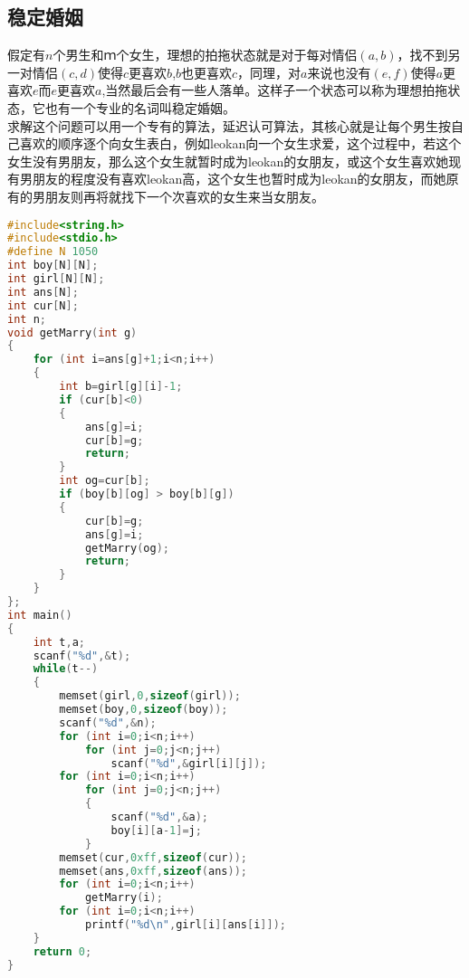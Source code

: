 \subsection{稳定婚姻}
	假定有$n$个男生和$ｍ$个女生，理想的拍拖状态就是对于每对情侣$(a,b)$，找不到另一对情侣$(c,d)$使得$c$更喜欢$b$,$b$也更喜欢$c$，同理，对$a$来说也没有$(e,f)$使得$a$更喜欢$e$而$e$更喜欢$a$,当然最后会有一些人落单。这样子一个状态可以称为理想拍拖状态，它也有一个专业的名词叫稳定婚姻。\\
	求解这个问题可以用一个专有的算法，延迟认可算法，其核心就是让每个男生按自己喜欢的顺序逐个向女生表白，例如leokan向一个女生求爱，这个过程中，若这个女生没有男朋友，那么这个女生就暂时成为leokan的女朋友，或这个女生喜欢她现有男朋友的程度没有喜欢leokan高，这个女生也暂时成为leokan的女朋友，而她原有的男朋友则再将就找下一个次喜欢的女生来当女朋友。
	\begin{lstlisting}[language=c++]
#include<string.h>
#include<stdio.h>
#define N 1050
int boy[N][N];
int girl[N][N];
int ans[N];
int cur[N];
int n;
void getMarry(int g)
{
	for (int i=ans[g]+1;i<n;i++)
	{
		int b=girl[g][i]-1;
		if (cur[b]<0)
		{
			ans[g]=i;
			cur[b]=g;
			return;
		}
		int og=cur[b];
		if (boy[b][og] > boy[b][g])
		{
			cur[b]=g;
			ans[g]=i;
			getMarry(og);
			return;
		}
	}
};
int main()
{
	int t,a;
	scanf("%d",&t);
	while(t--)
	{
		memset(girl,0,sizeof(girl));
		memset(boy,0,sizeof(boy));
		scanf("%d",&n);
		for (int i=0;i<n;i++)
			for (int j=0;j<n;j++)
				scanf("%d",&girl[i][j]);
		for (int i=0;i<n;i++)
			for (int j=0;j<n;j++)
			{
				scanf("%d",&a);
				boy[i][a-1]=j;
			}
		memset(cur,0xff,sizeof(cur));
		memset(ans,0xff,sizeof(ans));
		for (int i=0;i<n;i++)
			getMarry(i);
		for (int i=0;i<n;i++)
			printf("%d\n",girl[i][ans[i]]);
	}
	return 0;
}
	\end{lstlisting}